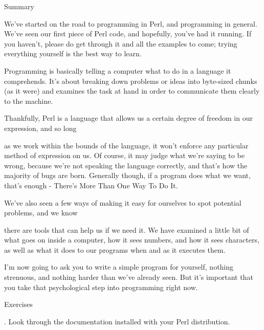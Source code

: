 \documentclass[a4paper,11pt]{book}
\begin{document}
\noindent 

\noindent Summary

\noindent 

\noindent We've started on the road to programming in Perl, and programming in general. We've seen our first piece of Perl code, and hopefully, you've had it running. If you haven't, please do get through it and all the examples to come; trying everything yourself is the best way to learn.

\noindent 

\noindent Programming is basically telling a computer what to do in a language it comprehends. It's about breaking down problems or ideas into byte-sized chunks (as it were) and examines the task at hand in order to communicate them clearly to the machine.

\noindent 

\noindent Thankfully, Perl is a language that allows us a certain degree of freedom in our expression, and so long

\noindent as we work within the bounds of the language, it won't enforce any particular method of expression on us. Of course, it may judge what we're saying to be wrong, because we're not speaking the language correctly, and that's how the majority of bugs are born. Generally though, if a program does what we want, that's enough - There's More Than One Way To Do It.

\noindent 

\noindent 

\noindent We've also seen a few ways of making it easy for ourselves to spot potential problems, and we know

\noindent there are tools that can help us if we need it. We have examined a little bit of what goes on inside a computer, how it sees numbers, and how it sees characters, as well as what it does to our programs when and as it executes them.

\noindent 

\noindent I'm now  going to  ask you  to  write  a  simple  program  for  yourself,  nothing  strenuous,  and nothing harder than we've already  seen.  But  it's  important  that  you  take  that  psychological  step  into programming right now.

\noindent 

\noindent 

\noindent Exercises

\noindent 

.   Look through the documentation installed with your Perl distribution.
\end{document}
